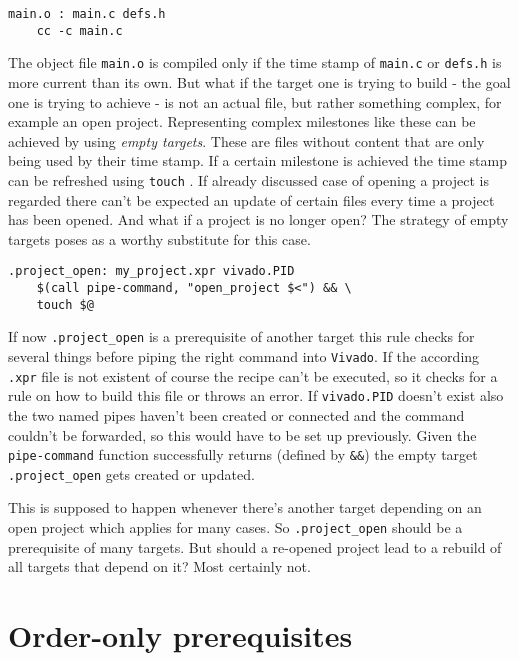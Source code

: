 \begin{lstlisting}[language={[gnu] make}, title={extracted from \cite[p. 4]{Make16}}]
main.o : main.c defs.h
	cc -c main.c
\end{lstlisting}
\noindent
The object file \texttt{main.o} is compiled only if the time stamp of \texttt{main.c} or \texttt{defs.h} is more current than its own. But what if the target one is trying to build - the goal one is trying to achieve - is not an actual file, but rather something complex, for example an open project. Representing complex milestones like these can be achieved by using \textit{empty targets}. These are files without content that are only being used by their time stamp. If a certain milestone is achieved the time stamp can be refreshed using \texttt{touch} \cite[see][p. 31]{Make16}. If already discussed case of opening a project is regarded there can't be expected an update of certain files every time a project has been opened. And what if a project is no longer open? The strategy of empty targets poses as a worthy substitute for this case.

\begin{lstlisting}[language={[gnu] make}, caption={Make recipe for opening a project: \texttt{\$<} = first prerequisite, \texttt{\$@} = first target}, captionpos=b, label={lst:proj}]
.project_open: my_project.xpr vivado.PID
	$(call pipe-command, "open_project $<") && \
	touch $@
\end{lstlisting}
\noindent
If now \texttt{.project\_open} is a prerequisite of another target this rule checks for several things before piping the right command into \texttt{Vivado}. If the according \texttt{.xpr} file is not existent of course the recipe can't be executed, so it checks for a rule on how to build this file or throws an error. If \texttt{vivado.PID} doesn't exist also the two named pipes haven't been created or connected and the command couldn't be forwarded, so this would have to be set up previously. Given the \texttt{pipe-command} function successfully returns (defined by \texttt{\&\&}) the empty target \texttt{.project\_open} gets created or updated. 

This is supposed to happen whenever there's another target depending on an open project which applies for many cases. So \texttt{.project\_open} should be a prerequisite of many targets. But should a re-opened project lead to a rebuild of all targets that depend on it? Most certainly not.

\section{Order-only prerequisites}

